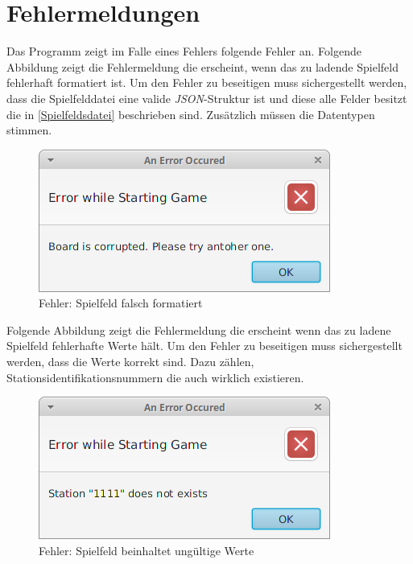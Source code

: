     \section{Fehlermeldungen}
        Das Programm zeigt im Falle eines Fehlers folgende Fehler an.
        \newline
        \newline
        Folgende Abbildung zeigt die Fehlermeldung die erscheint, wenn das zu ladende Spielfeld
        fehlerhaft formatiert ist. Um den Fehler zu beseitigen muss sichergestellt werden,
        dass die Spielfelddatei eine valide \textit{JSON}-Struktur ist und diese alle Felder besitzt
        die in \ref{Spielfeldsdatei} beschrieben sind. Zusätzlich müssen die Datentypen stimmen.
        \begin{figure}[H]
            \centering
            \includegraphics[scale=0.7]{img/benutzerhandbuch/error_boardcorrupted.png}   
            \caption{Fehler: Spielfeld falsch formatiert}
        \end{figure}
        Folgende Abbildung zeigt die Fehlermeldung die erscheint wenn das zu ladene Spielfeld fehlerhafte
        Werte hält. Um den Fehler zu beseitigen muss sichergestellt werden, dass die Werte korrekt sind.
        Dazu zählen, Stationsidentifikationsnummern die auch wirklich existieren.
        \begin{figure}[H]
            \centering
            \includegraphics[scale=0.7]{img/benutzerhandbuch/error_boardvalue.png}   
            \caption{Fehler: Spielfeld beinhaltet ungültige Werte}
        \end{figure}
